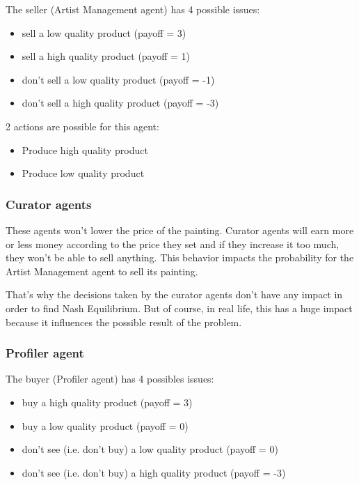 \documentclass[a4paper,11pt]{article}
\begin{document}
  The seller (Artist Management agent) has 4 possible issues:
  \begin{itemize}
   \item sell a low quality product (payoff = 3)
   \item sell a high quality product (payoff = 1)
   \item don't sell a low quality product (payoff = -1)
   \item don't sell a high quality product (payoff = -3)
  \end{itemize}
  
  2 actions are possible for this agent:
  \begin{itemize}
   \item Produce high quality product
   \item Produce low quality product
  \end{itemize}
  
  \subsubsection{Curator agents}

  These agents won't lower the price of the painting.
  Curator agents will earn more or less money according to the price they set and if 
  they increase it too much, they won't be able to sell anything. This behavior 
  impacts the probability for the Artist Management agent to sell its painting.
  
  That's why the decisions taken by the curator agents don't have any impact in order to 
  find Nash Equilibrium. But of course, in real life, this has a huge impact because it 
  influences the possible result of the problem.
  
  \subsubsection{Profiler agent}
  
  The buyer (Profiler agent) has 4 possibles issues:
  \begin{itemize}
   \item buy a high quality product (payoff = 3)
   \item buy a low quality product (payoff = 0)
   \item don't see (i.e. don't buy) a low quality product (payoff = 0)
   \item don't see (i.e. don't buy) a high quality product (payoff = -3)
  \end{itemize}
  
\end{document}
